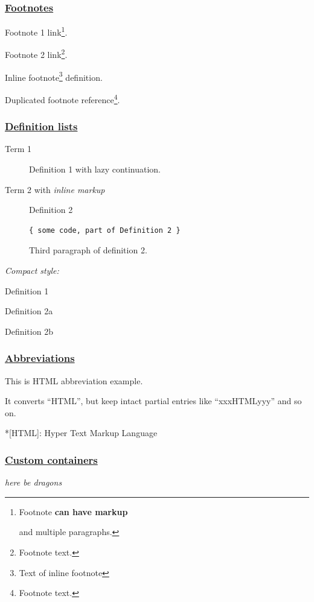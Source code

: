 \documentclass[
  paper=a4,
  ,captions=tableheading
]{scrartcl}
\providecommand{\tightlist}{%
  \setlength{\itemsep}{0pt}\setlength{\parskip}{0pt}}
\begin{document}
\hypertarget{footnotes}{%
\subsubsection{\texorpdfstring{\href{https://github.com/markdown-it/markdown-it-footnote}{Footnotes}}{Footnotes}}\label{footnotes}}

Footnote 1 link\footnote{Footnote \textbf{can have markup}

  and multiple paragraphs.}.

Footnote 2 link\footnote{Footnote text.}.

Inline footnote\footnote{Text of inline footnote} definition.

Duplicated footnote reference\footnote{Footnote text.}.

\hypertarget{definition-lists}{%
\subsubsection{\texorpdfstring{\href{https://github.com/markdown-it/markdown-it-deflist}{Definition
lists}}{Definition lists}}\label{definition-lists}}

\begin{description}
\item[Term 1]
Definition 1 with lazy continuation.
\item[Term 2 with \emph{inline markup}]
Definition 2

\begin{lstlisting}
{ some code, part of Definition 2 }
\end{lstlisting}

Third paragraph of definition 2.
\end{description}

\emph{Compact style:}

\begin{description}
\tightlist
\item[Term 1]
Definition 1
\item[Term 2]
Definition 2a

Definition 2b
\end{description}

\hypertarget{abbreviations}{%
\subsubsection{\texorpdfstring{\href{https://github.com/markdown-it/markdown-it-abbr}{Abbreviations}}{Abbreviations}}\label{abbreviations}}

This is HTML abbreviation example.

It converts ``HTML'', but keep intact partial entries like
``xxxHTMLyyy'' and so on.

*{[}HTML{]}: Hyper Text Markup Language

\hypertarget{custom-containers}{%
\subsubsection{\texorpdfstring{\href{https://github.com/markdown-it/markdown-it-container}{Custom
containers}}{Custom containers}}\label{custom-containers}}

\emph{here be dragons}
\end{document}
